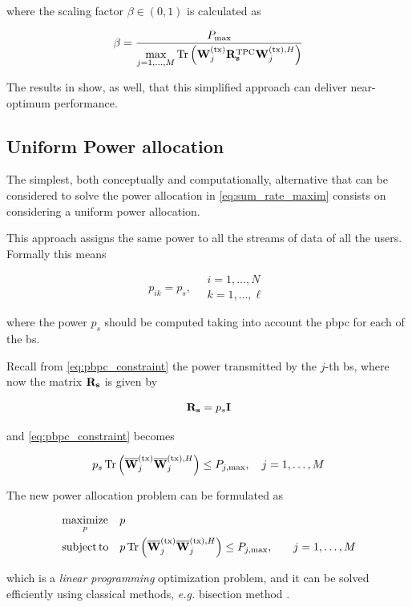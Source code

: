 \noindent
where the scaling factor $\beta \in \left(0, 1\right)$ is calculated as

\begin{equation} \label{eq:scaling_factor}
    \beta = \frac{P_{\max}}{\max\limits_{j=1, \ldots, M} \operatorname*{Tr}\left(
    \mathbf{W}^{(\text{tx})}_j \mathbf{R}_{\mathbf{s}}^{\text{TPC}} \mathbf{W}^{(\text{tx}),H}_j \right)}
\end{equation}

The results in \cite{zhang09} show, as well, that this simplified approach can
deliver near-optimum performance.

\subsection{Uniform Power allocation}\label{ssec:uniform_allocation}

The simplest, both conceptually and computationally, alternative that can be
considered to solve the power allocation in \eqref{eq:sum_rate_maxim} consists
on considering a uniform power allocation.

This approach assigns the same power to all the streams of data of all the
users. Formally this means

\begin{equation} \label{eq:equal_power}
    p_{ik} = p_{s}, \quad \begin{array}{l}
        i = 1, \ldots, N \\
        k = 1, \ldots, \ell
    \end{array}
\end{equation}

\noindent
where the power $p_s$ should be computed taking into account the \gls{pbpc} for
each of the \gls{bs}.

Recall from \eqref{eq:pbpc_constraint} the power transmitted by the $j$-th
\gls{bs}, where now the matrix $\mathbf{R}_{\mathbf{s}}$ is given by

\begin{equation} \label{eq:rs_equal}
    \mathbf{R}_{\mathbf{s}} = p_s \mathbf{I}
\end{equation}

\noindent
and \eqref{eq:pbpc_constraint} becomes

\begin{equation} \label{eq:pbpc_equal}
    p_s \operatorname*{Tr} \left( \mathbf{\overline{W}}^{(\text{tx})}_j \mathbf{\overline{W}}^{(\text{tx}),H}_j \right) \leq P_{j, \max}, \quad
    j = 1, \ldots, M
\end{equation}

The new power allocation problem can be formulated as

\begin{equation} \label{eq:equal_optim}
\begin{aligned}
    &\operatorname*{maximize}\limits_{p} && p \\
    &\operatorname*{subject\,to} && p \operatorname*{Tr} \left(\mathbf{\overline{W}}^{(\text{tx})}_j \mathbf{\overline{W}}^{(\text{tx}),H}_j \right) \leq P_{j, \max}, &\quad
    j = 1, \ldots, M
\end{aligned}
\end{equation}

\noindent
which is a \emph{linear programming} optimization problem, and it can be solved
efficiently using classical methods, \emph{e.g.} bisection method
\cite{burden_numerical}.
